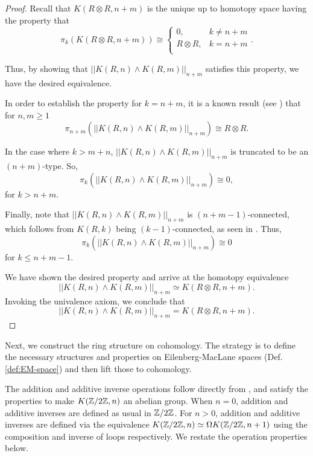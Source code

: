 \documentclass{amsart}
\begin{document}
\begin{proof}
	Recall that $K(R \otimes R, n+m)$ is the unique up to homotopy space
	having the property that
	\[
	\pi_k (K(R \otimes R, n+m )) \cong
	\begin{cases}
	0, & k \neq n+m \\
	R \otimes R, & k= n+m \\
	\end{cases}
	.\]
	
	Thus, by showing that $ || K(R,n) \wedge K(R,m) ||_{n+m} $
	satisfies this property, we have the desired
	equivalence. 
	
	In order to establish the property for $k=n+m$, it is a known result (see \cite[Prop 19.60]{strom:mcht}) that for $n,m\geq 1$
	\[
	\pi_{n+m} ( || K(R,n) \wedge K(R,m) ||_{n+m} )
	\cong R \otimes R.
	\]
	
	In the case where $k>m+n$, 
	 $ || K(R,n) \wedge K(R,m) ||_{n+m} $
	is truncated to be an $ ( n+m ) $-type. So, \[
	\pi_k ( || K(R,n) \wedge K(R,m) ||_{n+m} )
	\cong 0,
	\] for $k>n+m$. 
	
	Finally, note that  
	$ || K(R,n) \wedge K(R,m) ||_{n+m} $ is
	$ ( n+m-1 ) $-connected, which follows from $ K( R,k ) $ being
	$ ( k-1 ) $-connected, as seen in \cite[Prop 4.3.1]{brunerie:thesis}.
	Thus,
	\[
	\pi_k (|| K(R,n) \wedge K(R,m) ||_{n+m} ) \cong 0
	\]
	for $ k \leq n+m-1 $.
	
	We have shown the desired property and arrive at the homotopy equivalence 
	\[
	|| K(R,n) \wedge K(R,m) ||_{n+m} \simeq
	K (R \otimes R, n+m ).
	\]
	Invoking the univalence axiom, we conclude that
	\[
	|| K(R,n) \wedge K(R,m) ||_{n+m} =
	K (R \otimes R, n+m ).
	\]
\end{proof}



Next, we construct the ring structure on cohomology. The
strategy is to define the necessary structures and properties on Eilenberg-MacLane spaces (Def. \ref{def:EM-space})
and then lift those to cohomology.



The addition and additive inverse
operations follow
directly from \cite{brunerie:thesis}, and satisfy the properties to make $K(\mathbb{Z}/2\mathbb{Z},n)$ an abelian group. When $n=0$, addition and additive inverses are defined as usual in $\mathbb{Z}/2\mathbb{Z}$. For $n>0$, addition and additive inverses are defined via the equivalence $K(\mathbb{Z}/2\mathbb{Z},n)\simeq \Omega K(\mathbb{Z}/2\mathbb{Z},n+1)$ using the composition and inverse of loops respectively. We restate the operation properties below.
\end{document}
